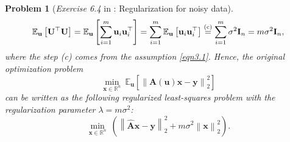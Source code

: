 \documentclass[11pt]{article}
\newtheorem{problem}{Problem}
\numberwithin{equation}{problem}
\begin{document}
\begin{problem} [\emph{Exercise 6.4} in \cite{calafiore2014optimization}: Regularization for noisy data]
{\begin{equation*}
    \mathbb{E}_{\mathbf{u}} \left[ \mathbf{U}^{\top} \mathbf{U} \right] =
    \mathbb{E}_{\mathbf{u}} \left[ \sum_{i=1}^{m} \mathbf{u}_i \mathbf{u}_{i}^{\top} \right]
    = \sum_{i=1}^{m} \mathbb{E}_{\mathbf{u}} \left[ \mathbf{u}_i \mathbf{u}_{i}^{\top} \right]
    \stackrel{\textnormal{(c)}}{=} \sum_{i=1}^{m} \sigma^2 \mathbf{I}_n
    = m \sigma^2 \mathbf{I}_n,
\end{equation*}
where the step (c) comes from the assumption \eqref{eqn3.1}. Hence, the original optimization problem
\begin{equation*}
    \min_{\mathbf{x} \in \mathbb{R}^n} \ \mathbb{E}_{\mathbf{u}} \left[ \left\| \mathbf{A} (\mathbf{u}) \mathbf{x} - \mathbf{y} \right\|_{2}^2 \right]
\end{equation*}
can be written as the following regularized least-squares problem with the regularization parameter $\lambda = m \sigma^2$:
\begin{equation*}
    \min_{\mathbf{x} \in \mathbb{R}^n} \ \left( \left\| \hat{\mathbf{A}} \mathbf{x} - \mathbf{y} \right\|_{2}^2 + m \sigma^2 \left\| \mathbf{x} \right\|_{2}^2 \right).
\end{equation*}
}
\end{problem}
\end{document}
